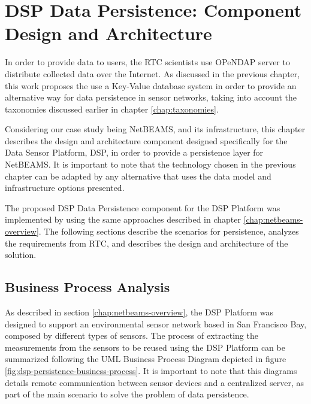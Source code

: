 

\chapter{DSP Data Persistence: Component Design and Architecture}

In order to provide data to users, the RTC scientists use OPeNDAP \cite{opendap}
server to distribute collected data over the Internet. As discussed in the
previous chapter, this work proposes the use a Key-Value database system
in order to provide an alternative way for data persistence in sensor
networks, taking into account the taxonomies discussed earlier in chapter 
\ref{chap:taxonomies}. 

Considering our case study being NetBEAMS, and its infrastructure, this chapter
describes the design and architecture component designed specifically for the
Data Sensor Platform, DSP, in order to provide a persistence layer for
NetBEAMS. It is important to note that the technology chosen in the previous
chapter can be adapted by any alternative that uses the data model and
infrastructure options presented.

The proposed DSP Data Persistence component for the DSP Platform was
implemented by using the same approaches described in chapter
\ref{chap:netbeams-overview}. The following sections describe the scenarios
for persistence, analyzes the requirements from RTC, and describes the design
and architecture of the solution.

\section{Business Process Analysis}
\label{sec:business-process-analysis}
As described in section \ref{chap:netbeams-overview}, the DSP Platform was
designed to support an environmental sensor network based in San Francisco
Bay, composed by different types of sensors. The process of extracting the
measurements from the sensors to be reused using the DSP Platform can be
summarized following the UML Business Process Diagram \cite{uml} depicted in
figure \ref{fig:dsp-persistence-business-process}. It is important to note
that this diagrams details remote communication between sensor devices and a
centralized server, as part of the main scenario to solve the problem of data
persistence.

